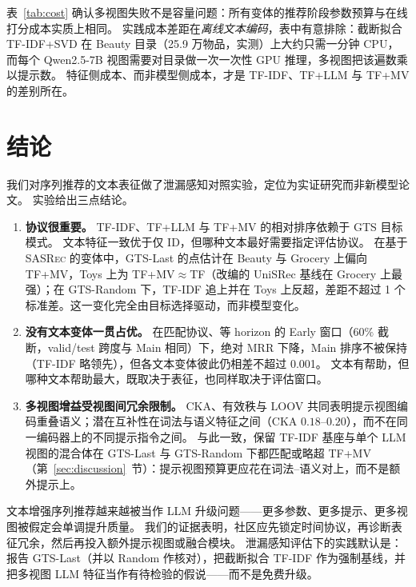 \documentclass[sigconf,natbib=true,anonymous]{acmart}
\newcommand{\tfidf}{\textsc{TF-IDF}\xspace}
\newcommand{\tfllm}{\textsc{TF+LLM}\xspace}
\newcommand{\tfmv}{\textsc{TF+MV}\xspace}
\newcommand{\base}{\textsc{SASRec}\xspace}
\begin{document}
表~\ref{tab:cost} 确认多视图失败不是容量问题：所有变体的推荐阶段参数预算与在线打分成本实质上相同。
实践成本差距在\emph{离线文本编码}，表中有意排除：截断拟合 \tfidf+SVD 在 Beauty 目录（25.9 万物品，实测）上大约只需一分钟 CPU，而每个 Qwen2.5-7B 视图需要对目录做一次一次性 GPU 推理，多视图把该遍数乘以提示数。
特征侧成本、而非模型侧成本，才是 \tfidf、\tfllm 与 \tfmv 的差别所在。

\section{结论}
\label{sec:conclusion}

我们对序列推荐的文本表征做了泄漏感知对照实验，定位为实证研究而非新模型论文。
实验给出三点结论。

\begin{enumerate}[leftmargin=*,itemsep=1pt]
\item \textbf{协议很重要。}
\tfidf、\tfllm 与 \tfmv 的相对排序依赖于 GTS 目标模式。
文本特征一致优于仅 ID，但哪种文本最好需要指定评估协议。
在基于 \base 的变体中，GTS-Last 的点估计在 Beauty 与 Grocery 上偏向 \tfmv，Toys 上为 TF+MV${}\approx{}$TF（改编的 UniSRec 基线在 Grocery 上最强）；在 GTS-Random 下，\tfidf 追上并在 Toys 上反超，差距不超过 1 个标准差。这一变化完全由目标选择驱动，而非模型变化。
\item \textbf{没有文本变体一贯占优。}
在匹配协议、等 horizon 的 Early 窗口（$60\%$ 截断，valid/test 跨度与 Main 相同）下，绝对 MRR 下降，Main 排序不被保持（\tfidf 略领先），但各文本变体彼此仍相差不超过 0.001。
文本有帮助，但哪种文本帮助最大，既取决于表征，也同样取决于评估窗口。
\item \textbf{多视图增益受视图间冗余限制。}
CKA、有效秩与 LOOV 共同表明提示视图编码重叠语义；潜在互补性在词法与语义特征之间（CKA $0.18$--$0.20$），而不在同一编码器上的不同提示指令之间。
与此一致，保留 \tfidf 基座与单个 LLM 视图的混合体在 GTS-Last 与 GTS-Random 下都匹配或略超 \tfmv（第~\ref{sec:discussion}~节）：提示视图预算更应花在词法--语义对上，而不是额外提示上。
\end{enumerate}

文本增强序列推荐越来越被当作 LLM 升级问题——更多参数、更多提示、更多视图被假定会单调提升质量。
我们的证据表明，社区应先锁定时间协议，再诊断表征冗余，然后再投入额外提示视图或融合模块。
泄漏感知评估下的实践默认是：报告 GTS-Last（并以 Random 作核对），把截断拟合 \tfidf 作为强制基线，并把多视图 LLM 特征当作有待检验的假说——而不是免费升级。
\end{document}
